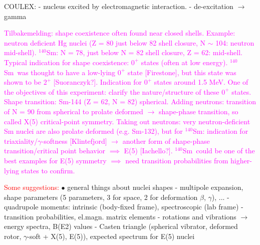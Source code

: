 \documentclass[twoside,english]{uiofysmaster/uiofysmaster}
\newcommand{\Sm}{$^{140}$Sm} %
\newcommand{\ga}{$\gamma$}
\begin{document}
\bigskip

COULEX: \newline
- nucleus excited by electromagnetic interaction. \newline
- de-excitation $\rightarrow$ gamma

\bigskip

\textcolor{Magenta}{Tilbakemelding: \newline 
shape coexistence often found near closed shells. Example: neutron deficient Hg nuclei (Z = 80 just below 82 shell closure, N $\sim$ 104: neutron mid-shell). \newline
\Sm: N = 78, just below N = 82 shell closure, Z = 62: mid-shell. \newline
Typical indication for shape coexistence: $0^+$ states (often at low energy). \newline 
\Sm\ was thought to have a low-lying $0^+$ state [Firestone], but this state was shown to be $2^+$ [Suoranczyk?]. Indication for $0^+$ states around 1.5 MeV. \newline 
One of the objectives of this experiment: clarify the nature/structure of these $0^+$ states. \newline 
Shape transition: Sm-144 (Z = 62, N = 82) spherical. Adding neutrons: transition of N = 90 from spherical to prolate deformed $\rightarrow$ shape-phase transition, so called X(5) critical-point symmetry. \newline
Taking out neutrons: very neutron-deficient Sm nuclei are also prolate deformed (e.g. Sm-132), but for \Sm: indication for triaxiality/\ga-softness [Klintefjord] $\rightarrow$ another form of shape-phase transition/critical point behavior $\implies$ E(5) [Iachello?]. \Sm\ could be one of the best examples for E(5) symmetry $\implies$ need transition probabilities from higher-lying states to confirm.} \newline


\textcolor{red}{Some suggestions:} \newline
$\bullet$ general things about nuclei shapes \newline
- multipole expansion, shape parameters (5 parameters, 3 for space, 2 for deformation $\beta$, \ga), ... \newline
- quadrupole moments: intrinsic (body-fixed frame), spectroscopic (lab frame)  \newline
- transition probabilities, el.magn. matrix elements  \newline
- rotations and vibrations $\rightarrow$ energy spectra, B(E2) values  \newline
- Casten triangle (spherical vibrator, deformed rotor, \ga-soft + X(5), E(5)), expected spectrum for E(5) nuclei \newline
\end{document}
